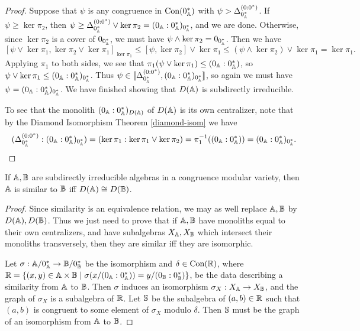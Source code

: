 \begin{appendices}
\begin{proof}
Suppose that $\psi$ is any congruence in $\operatorname{Con}(0_{\mathbb{A}}^*)$ with $\psi > \Delta_{0_{\mathbb{A}}^*}^{(0:0^*)}$. If $\psi \ge \ker \pi_2$, then $\psi \ge \Delta_{0_{\mathbb{A}}^*}^{(0:0^*)} \vee \ker \pi_2 = (0_{\mathbb{A}} : 0_{\mathbb{A}}^*)_{0_{\mathbb{A}}^*}$, and we are done. Otherwise, since $\ker \pi_2$ is a cover of $0_{0_{\mathbb{A}}^*}$, we must have $\psi \wedge \ker \pi_2 = 0_{0_{\mathbb{A}}^*}$. Then we have
\[
[\psi \vee \ker \pi_1, \ker \pi_2 \vee \ker \pi_1]_{\ker \pi_1} \le [\psi, \ker \pi_2] \vee \ker \pi_1 \le (\psi \wedge \ker \pi_2) \vee \ker \pi_1 = \ker \pi_1.
\]
Applying $\pi_1$ to both sides, we see that $\pi_1(\psi \vee \ker \pi_1) \le (0_{\mathbb{A}} : 0_{\mathbb{A}}^*)$, so $\psi \vee \ker \pi_1 \le (0_{\mathbb{A}} : 0_{\mathbb{A}}^*)_{0_{\mathbb{A}}^*}$. Thus $\psi \in \llbracket \Delta_{0_{\mathbb{A}}^*}^{(0:0^*)}, (0_{\mathbb{A}} : 0_{\mathbb{A}}^*)_{0_{\mathbb{A}}^*}\rrbracket$, so again we must have $\psi = (0_{\mathbb{A}} : 0_{\mathbb{A}}^*)_{0_{\mathbb{A}}^*}$. We have finished showing that $D(\mathbb{A})$ is subdirectly irreducible.

To see that the monolith $(0_{\mathbb{A}}:0_{\mathbb{A}}^*)_{D(\mathbb{A})}$ of $D(\mathbb{A})$ is its own centralizer, note that by the Diamond Isomorphism Theorem \ref{diamond-isom} we have
\[
(\Delta_{0_{\mathbb{A}}^*}^{(0:0^*)} : (0_{\mathbb{A}} : 0_{\mathbb{A}}^*)_{0_{\mathbb{A}}^*}) = (\ker \pi_1 : \ker \pi_1 \vee \ker \pi_2) = \pi_1^{-1}((0_{\mathbb{A}} : 0_{\mathbb{A}}^*)) = (0_{\mathbb{A}} : 0_{\mathbb{A}}^*)_{0_{\mathbb{A}}^*}.\qedhere
\]
\end{proof}

\begin{prop} If $\mathbb{A}, \mathbb{B}$ are subdirectly irreducible algebras in a congruence modular variety, then $\mathbb{A}$ is similar to $\mathbb{B}$ iff $D(\mathbb{A}) \cong D(\mathbb{B})$.
\end{prop}
\begin{proof} Since similarity is an equivalence relation, we may as well replace $\mathbb{A}, \mathbb{B}$ by $D(\mathbb{A}), D(\mathbb{B})$. Thus we just need to prove that if $\mathbb{A}, \mathbb{B}$ have monoliths equal to their own centralizers, and have subalgebras $X_{\mathbb{A}}, X_{\mathbb{B}}$ which intersect their monoliths transversely, then they are similar iff they are isomorphic.

Let $\sigma : \mathbb{A}/0_{\mathbb{A}}^* \rightarrow \mathbb{B}/0_{\mathbb{B}}^*$ be the isomorphism and $\delta \in \operatorname{Con}(\mathbb{R})$, where $\mathbb{R} = \{(x,y) \in \mathbb{A} \times \mathbb{B} \mid \sigma(x/(0_{\mathbb{A}}:0_{\mathbb{A}}^*)) = y/(0_{\mathbb{B}}:0_{\mathbb{B}}^*)\}$, be the data describing a similarity from $\mathbb{A}$ to $\mathbb{B}$. Then $\sigma$ induces an isomorphism $\sigma_X : X_{\mathbb{A}} \rightarrow X_{\mathbb{B}}$, and the graph of $\sigma_X$ is a subalgebra of $\mathbb{R}$. Let $\mathbb{S}$ be the subalgebra of $(a,b) \in \mathbb{R}$ such that $(a,b)$ is congruent to some element of $\sigma_X$ modulo $\delta$. Then $\mathbb{S}$ must be the graph of an isomorphism from $\mathbb{A}$ to $\mathbb{B}$.
\end{proof}


\end{appendices}
